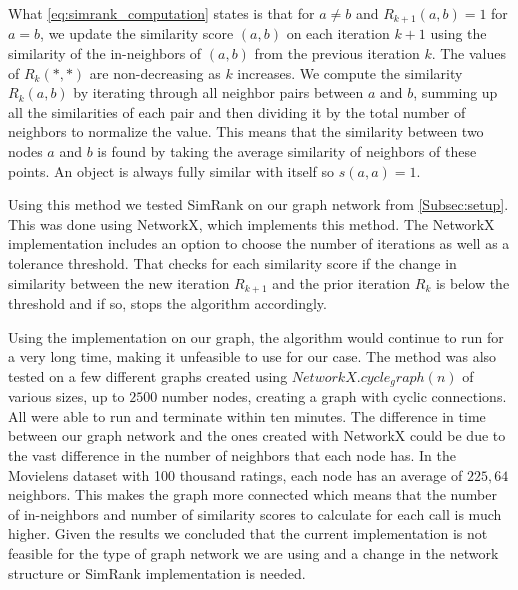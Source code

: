 What \autoref{eq:simrank_computation} states is that for $a \neq b$ and $R_{k+1}(a,b) = 1$ for $a = b$, we update the similarity score $(a,b)$ on each iteration $k+1$ using the similarity of the in-neighbors of $(a,b)$ from the previous iteration $k$. The values of $R_k(*,*)$ are non-decreasing as $k$ increases.
We compute the similarity $R_k(a,b)$ by iterating through all neighbor pairs between $a$ and $b$, summing up all the similarities of each pair and then dividing it by the total number of neighbors to normalize the value.
This means that the similarity between two nodes $a$ and $b$ is found by taking the average similarity of neighbors of these points. An object is always fully similar with itself so $s(a,a) = 1$.

Using this method we tested SimRank on our graph network from \autoref{Subsec:setup}. This was done using NetworkX, which implements this method. The NetworkX implementation includes an option to choose the number of iterations as well as a tolerance threshold. That checks for each similarity score if the change in similarity between the new iteration $R_{k+1}$ and the prior iteration $R_k$ is below the threshold and if so, stops the algorithm accordingly.

Using the implementation on our graph, the algorithm would continue to run for a very long time, making it unfeasible to use for our case.
The method was also tested on a few different graphs created using $NetworkX.cycle_graph(n)$ of various sizes, up to $2500$ number nodes, creating a graph with cyclic connections. All were able to run and terminate within ten minutes.
The difference in time between our graph network and the ones created with NetworkX could be due to the vast difference in the number of neighbors that each node has.
In the Movielens dataset with 100 thousand ratings, each node has an average of $225,64$ neighbors. 
This makes the graph more connected which means that the number of in-neighbors and number of similarity scores to calculate for each call is much higher.
Given the results we concluded that the current implementation is not feasible for the type of graph network we are using and a change in the network structure or SimRank implementation is needed.
